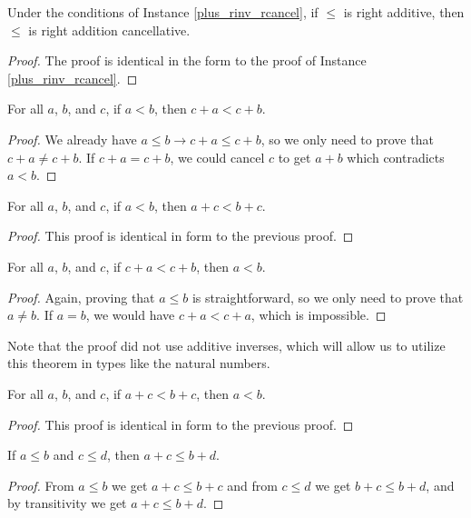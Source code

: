 \documentclass[../math.tex]{subfiles}
\begin{document}
\begin{instance}
    Under the conditions of Instance \ref{plus_rinv_rcancel}, if $\leq$ is right
    additive, then $\leq$ is right addition cancellative.
\end{instance}
\begin{proof}
    The proof is identical in the form to the proof of Instance
    \ref{plus_rinv_rcancel}.
\end{proof}

\begin{theorem}
    For all $a$, $b$, and $c$, if $a < b$, then $c + a < c + b$.
\end{theorem}
\begin{proof}
    We already have $a \leq b \rightarrow c + a \leq c + b$, so we only need to
    prove that $c + a \neq c + b$.  If $c + a = c + b$, we could cancel $c$ to
    get $a + b$ which contradicts $a < b$.
\end{proof}

\begin{theorem}
    For all $a$, $b$, and $c$, if $a < b$, then $a + c < b + c$.
\end{theorem}
\begin{proof}
    This proof is identical in form to the previous proof.
\end{proof}

\begin{theorem}
    For all $a$, $b$, and $c$, if $c + a < c + b$, then $a < b$.
\end{theorem}
\begin{proof}
    Again, proving that $a \leq b$ is straightforward, so we only need to prove
    that $a \neq b$.  If $a = b$, we would have $c + a < c + a$, which is
    impossible.
\end{proof}
\noindent Note that the proof did not use additive inverses, which will allow us
to utilize this theorem in types like the natural numbers.

\begin{theorem}
    For all $a$, $b$, and $c$, if $a + c < b + c$, then $a < b$.
\end{theorem}
\begin{proof}
    This proof is identical in form to the previous proof.
\end{proof}

\begin{theorem} \label{le_lrplus}
    If $a \leq b$ and $c \leq d$, then $a + c \leq b + d$.
\end{theorem}
\begin{proof}
    From $a \leq b$ we get $a + c \leq b + c$ and from $c \leq d$ we get $b + c
    \leq b + d$, and by transitivity we get $a + c \leq b + d$.
\end{proof}
\end{document}
